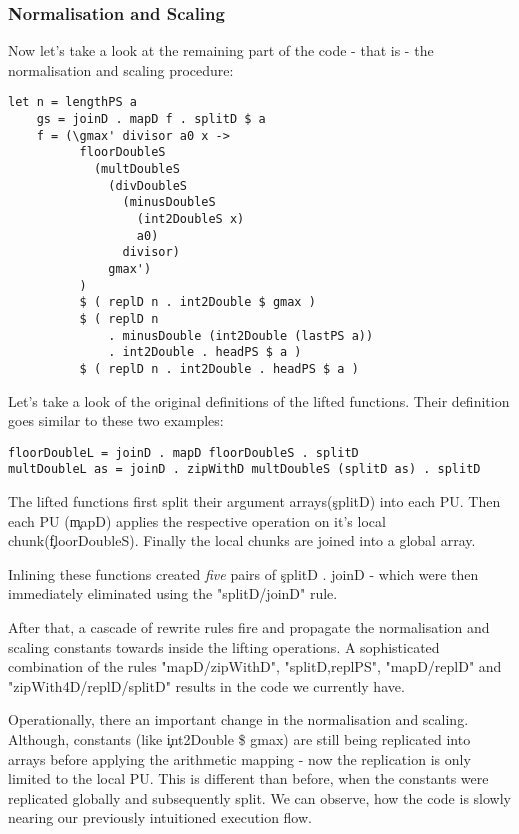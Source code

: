       \subsubsection{Normalisation and Scaling}
      
      Now let's take a look at the remaining part of the code - that is - the
      normalisation and scaling procedure:
      
      \begin{lstlisting}
let n = lengthPS a
    gs = joinD . mapD f . splitD $ a
    f = (\gmax' divisor a0 x ->
          floorDoubleS
            (multDoubleS
              (divDoubleS
                (minusDoubleS
                  (int2DoubleS x)
                  a0)
                divisor)
              gmax')
          )
          $ ( replD n . int2Double $ gmax )
          $ ( replD n
              . minusDouble (int2Double (lastPS a))
              . int2Double . headPS $ a )
          $ ( replD n . int2Double . headPS $ a )
      \end{lstlisting}
      Let's take a look of the original definitions of the lifted functions. Their definition goes similar to these two examples:
      \begin{lstlisting}
floorDoubleL = joinD . mapD floorDoubleS . splitD
multDoubleL as = joinD . zipWithD multDoubleS (splitD as) . splitD
      \end{lstlisting}
      The lifted functions first split their argument arrays(\c{splitD}) into each PU.
      Then each PU (\c{mapD}) applies the respective operation on it's local chunk(\c{floorDoubleS}).
      Finally the local chunks are joined into a global array.
      
      Inlining these functions created \emph{five} pairs of \c{splitD . joinD} - which were then immediately
      eliminated using the "splitD/joinD" rule.
      
      After that, a cascade of rewrite rules fire and propagate the normalisation and scaling
      constants towards inside the lifting operations. A sophisticated combination of the rules
      "mapD/zipWithD", "splitD,replPS", "mapD/replD" and "zipWith4D/replD/splitD" results in
      the code we currently have.
      
      Operationally, there an important change in the normalisation and scaling.
      Although, constants (like \c{int2Double \$ gmax}) are still being replicated into arrays
      before applying the arithmetic mapping - now the replication
      is only limited to the local PU. This is different than before, when
      the constants were replicated globally and subsequently split.
      We can observe, how the code is slowly nearing our previously intuitioned execution flow.
      
